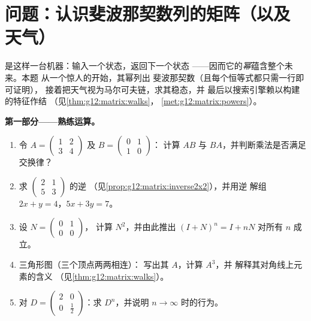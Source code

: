 \section{问题：认识斐波那契数列的矩阵（以及
天气）}

\begin{problem}
\label{pb:g12:matrix:1}
是这样一台机器：输入一个状态，返回下一个状态
——因而它的\emph{幂}蕴含整个未来。本题
从一个惊人的开始，其幂列出
斐波那契数（且每个恒等式都只需一行即可证明），
接着把天气视为马尔可夫链，求其稳态，并
最后以搜索引擎赖以构建的特征作结
（见\cref{thm:g12:matrix:walks}，
\cref{met:g12:matrix:powers}）。

\medskip
\noindent\textbf{第一部分——熟练运算。}
\begin{enumerate}
  \item 令 $A = \begin{pmatrix} 1 & 2\\ 3 & 4\end{pmatrix}$
        及 $B = \begin{pmatrix} 0 & 1\\ 1 & 0\end{pmatrix}$：
        计算 $AB$ 与 $BA$，并判断乘法是否满足交换律？
  \item 求 $\begin{pmatrix} 2 & 1\\ 5 & 3\end{pmatrix}$ 的逆
        （见\cref{prop:g12:matrix:inverse2x2}），并用逆
        解组 $2x + y = 4$，$5x + 3y = 7$。
  \item 设 $N = \begin{pmatrix} 0 & 1\\ 0 & 0\end{pmatrix}$，
        计算 $N^2$，并由此推出
        $(I + N)^n = I + nN$ 对所有 $n$ 成立。
  \item 三角形图（三个顶点两两相连）：
        写出其 $A$，计算 $A^3$，并
        解释其对角线上元素的含义
        （见\cref{thm:g12:matrix:walks}）。
  \item 对 $D = \begin{pmatrix} 2 & 0\\ 0 & \frac12
        \end{pmatrix}$：求 $D^n$，并说明
        $n \to \infty$ 时的行为。
\end{enumerate}


\end{problem}
